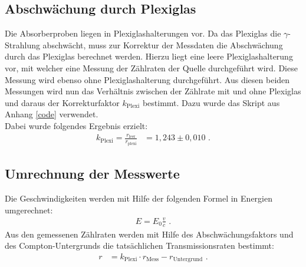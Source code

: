 \subsection{Abschwächung durch Plexiglas}

Die Absorberproben liegen in Plexiglashalterungen vor. Da das Plexiglas die $\gamma$-Strahlung abschwächt, muss zur Korrektur der Messdaten die Abschwächung durch das Plexiglas berechnet werden. Hierzu liegt eine leere Plexiglashalterung vor, mit welcher eine Messung der Zählraten der Quelle durchgeführt wird. Diese Messung wird ebenso ohne Plexiglashalterung durchgeführt. Aus diesen beiden Messungen wird nun das Verhältnis zwischen der Zählrate mit und ohne Plexiglas und daraus der Korrekturfaktor $k_\text{Plexi}$ bestimmt. Dazu wurde das Skript  aus Anhang \ref{code} verwendet.\\

Dabei wurde folgendes Ergebnis erzielt:
\begin{align}
	k_\text{Plexi}=\frac{r_\text{leer}}{r_\text{plexi}}&=1,243\pm0,010\text{ .}
\end{align}

\subsection{Umrechnung der Messwerte}
Die Geschwindigkeiten werden mit Hilfe der folgenden Formel in Energien umgerechnet:
\begin{align}
	E=E_0\frac{v}{c}\text{ .}\label{vtoE}
\end{align}
Aus den gemessenen Zählraten werden mit Hilfe des Abschwächungsfaktors und des Compton-Untergrunds die tatsächlichen Transmissionsraten bestimmt:
\begin{align}
	r&=k_\mathrm{Plexi}\cdot r_\mathrm{Mess}-r_\mathrm{Untergrund}\text{ .}
\end{align}

